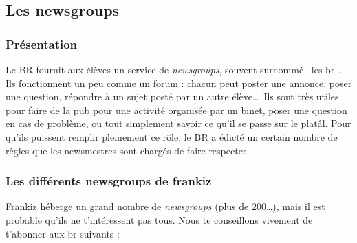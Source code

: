 \subsection{Les newsgroups}
\label{newsgroups}
\subsubsection{Présentation}
Le BR fournit aux élèves un service de \emph{newsgroups}, souvent surnommé \guillemotleft~les br~\guillemotright . Ils fonctionnent un peu comme un
forum : chacun peut poster une annonce, poser une question,
 répondre à un sujet posté par un autre élève\ldots\
Ils sont très utiles pour faire de la pub pour une activité
organisée par un binet, poser une question en cas de problème, ou
tout simplement savoir ce qu'il se passe sur le platâl. Pour qu'ils
puissent remplir pleinement ce rôle, le BR a édicté un certain
nombre de règles que les newsmestres sont chargés de faire
respecter.

\subsubsection{Les différents newsgroups de frankiz}
Frankiz héberge un grand nombre de \emph{newsgroups} (plus de 200\dots ), mais il est probable qu'ils ne t'intéressent pas tous.
Nous te conseillons vivement de t'abonner aux br suivants :

